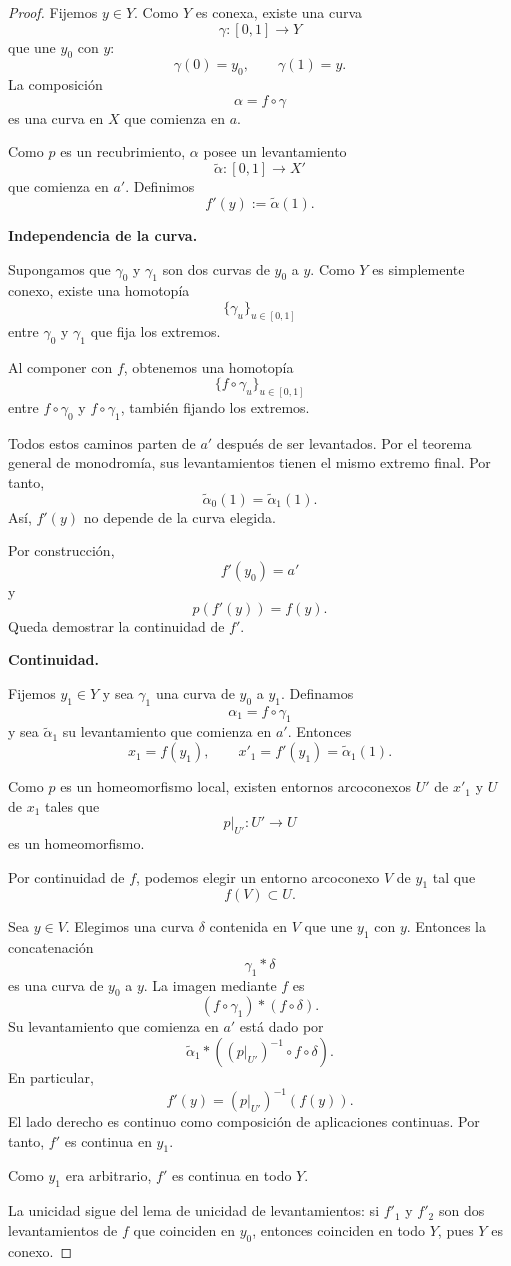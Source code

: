 \documentclass[11pt,a4paper]{article}
\theoremstyle{definition}
\theoremstyle{plain}
\theoremstyle{remark}
\newcommand{\I}{[0,1]}
\begin{document}
\begin{proof}
Fijemos $y\in Y$. Como $Y$ es conexa, existe una curva
\[
\gamma:\I\longrightarrow Y
\]
que une $y_0$ con $y$:
\[
\gamma(0)=y_0,
\qquad
\gamma(1)=y.
\]
La composición
\[
\alpha=f\circ\gamma
\]
es una curva en $X$ que comienza en $a$.

Como $p$ es un recubrimiento, $\alpha$ posee un levantamiento
\[
\widetilde\alpha:\I\longrightarrow X'
\]
que comienza en $a'$. Definimos
\[
f'(y):=\widetilde\alpha(1).
\]

\medskip
\textbf{Independencia de la curva.}

Supongamos que $\gamma_0$ y $\gamma_1$ son dos curvas de $y_0$ a $y$.
Como $Y$ es simplemente conexo, existe una homotopía
\[
\{\gamma_u\}_{u\in\I}
\]
entre $\gamma_0$ y $\gamma_1$ que fija los extremos.

Al componer con $f$, obtenemos una homotopía
\[
\{f\circ\gamma_u\}_{u\in\I}
\]
entre $f\circ\gamma_0$ y $f\circ\gamma_1$, también fijando los
extremos.

Todos estos caminos parten de $a'$ después de ser levantados.
Por el teorema general de monodromía, sus levantamientos tienen el
mismo extremo final. Por tanto,
\[
\widetilde\alpha_0(1)=\widetilde\alpha_1(1).
\]
Así, $f'(y)$ no depende de la curva elegida.

Por construcción,
\[
f'(y_0)=a'
\]
y
\[
p(f'(y))=f(y).
\]
Queda demostrar la continuidad de $f'$.

\medskip
\textbf{Continuidad.}

Fijemos $y_1\in Y$ y sea $\gamma_1$ una curva de $y_0$ a $y_1$.
Definamos
\[
\alpha_1=f\circ\gamma_1
\]
y sea $\widetilde\alpha_1$ su levantamiento que comienza en $a'$.
Entonces
\[
x_1=f(y_1),
\qquad
x'_1=f'(y_1)=\widetilde\alpha_1(1).
\]

Como $p$ es un homeomorfismo local, existen entornos arcoconexos
$U'$ de $x'_1$ y $U$ de $x_1$ tales que
\[
p|_{U'}:U'\longrightarrow U
\]
es un homeomorfismo.

Por continuidad de $f$, podemos elegir un entorno arcoconexo $V$ de
$y_1$ tal que
\[
f(V)\subset U.
\]

Sea $y\in V$. Elegimos una curva $\delta$ contenida en $V$ que une
$y_1$ con $y$. Entonces la concatenación
\[
\gamma_1*\delta
\]
es una curva de $y_0$ a $y$. La imagen mediante $f$ es
\[
(f\circ\gamma_1)*(f\circ\delta).
\]
Su levantamiento que comienza en $a'$ está dado por
\[
\widetilde\alpha_1*
\left((p|_{U'})^{-1}\circ f\circ\delta\right).
\]
En particular,
\[
f'(y)
=
(p|_{U'})^{-1}(f(y)).
\]
El lado derecho es continuo como composición de aplicaciones
continuas. Por tanto, $f'$ es continua en $y_1$.

Como $y_1$ era arbitrario, $f'$ es continua en todo $Y$.

La unicidad sigue del lema de unicidad de levantamientos: si $f'_1$ y
$f'_2$ son dos levantamientos de $f$ que coinciden en $y_0$, entonces
coinciden en todo $Y$, pues $Y$ es conexo.
\end{proof}
\end{document}
